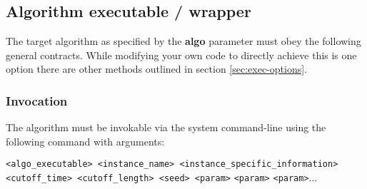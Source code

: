 \documentclass[manual.tex]{subfiles}
\begin{document}
\subsection{Algorithm executable / wrapper}

\label{sec:exec-spec} The target algorithm as specified by the \textbf{algo} parameter must obey the following general contracts. While modifying your own code to directly achieve this is one option there are other methods outlined in section \ref{sec:exec-options}.

\subsubsection{Invocation}

The algorithm must be invokable via the system command-line using the following command with arguments:

\texttt{<algo\_executable> <instance\_name> <instance\_specific\_information>
<cutoff\_time> <cutoff\_length> <seed> <param>} \texttt{<param>} \texttt{<param>}...
\end{document}
